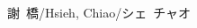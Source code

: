 \documentclass[letterpaper, UTF8]{scrartcl}
\newcommand{\MarginText}[1]{\marginpar{\raggedleft\itshape\small#1}} %
\newcommand{\Description}[1]{\hangindent=0em\hangafter=0\noindent\raggedright\footnotesize{#1}\par\normalsize\vspace{0.3em}}
\newcommand{\reducesep}{\vspace{-0.3em}}
\begin{document}
\begin{CJK}{UTF8}{kai}
\begin{cv}{謝~橋/Hsieh, Chiao/シェ~チャオ}
\begin{comment}
\Description{\MarginText{Languages}\parbox{\langbox}{\textsc{Chinese}} $\cdot$ Mother tongue}

\reducesep

\Description{\parbox{\langbox}{\textsc{English}} $\cdot$ Professionally Fluent}

\reducesep

\Description{\parbox{\langbox}{\textsc{Japanese}} $\cdot$ Basic (can read news passages)}
\end{comment}

\end{cv}
\end{CJK}
\end{document}

